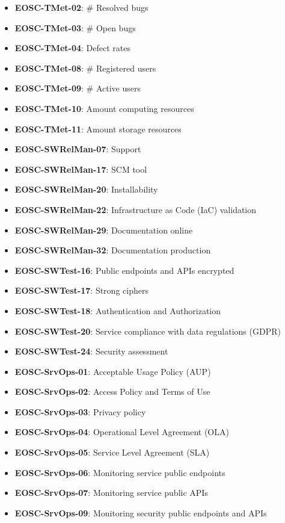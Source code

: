 \begin{itemize}
    \item \textbf{EOSC-TMet-02}: \# Resolved bugs
    \item \textbf{EOSC-TMet-03}: \# Open bugs
    \item \textbf{EOSC-TMet-04}: Defect rates
    \item \textbf{EOSC-TMet-08}: \# Registered users
    \item \textbf{EOSC-TMet-09}: \# Active users
    \item \textbf{EOSC-TMet-10}: Amount computing resources
    \item \textbf{EOSC-TMet-11}: Amount storage resources
    \item \textbf{EOSC-SWRelMan-07}: Support
    \item \textbf{EOSC-SWRelMan-17}: SCM tool
    \item \textbf{EOSC-SWRelMan-20}: Installability
    \item \textbf{EOSC-SWRelMan-22}: Infrastructure as Code (IaC) validation
    \item \textbf{EOSC-SWRelMan-29}: Documentation online
    \item \textbf{EOSC-SWRelMan-32}: Documentation production
    \item \textbf{EOSC-SWTest-16}: Public endpoints and APIs encrypted
    \item \textbf{EOSC-SWTest-17}: Strong ciphers
    \item \textbf{EOSC-SWTest-18}: Authentication and Authorization
    \item \textbf{EOSC-SWTest-20}: Service compliance with data regulations (GDPR)
    \item \textbf{EOSC-SWTest-24}: Security assessment
    \item \textbf{EOSC-SrvOps-01}: Acceptable Usage Policy (AUP)
    \item \textbf{EOSC-SrvOps-02}: Access Policy and Terms of Use
    \item \textbf{EOSC-SrvOps-03}: Privacy policy
    \item \textbf{EOSC-SrvOps-04}: Operational Level Agreement (OLA)
    \item \textbf{EOSC-SrvOps-05}: Service Level Agreement (SLA)
    \item \textbf{EOSC-SrvOps-06}: Monitoring service public endpoints
    \item \textbf{EOSC-SrvOps-07}: Monitoring service public APIs
    \item \textbf{EOSC-SrvOps-09}: Monitoring security public endpoints and APIs
\end{itemize}

